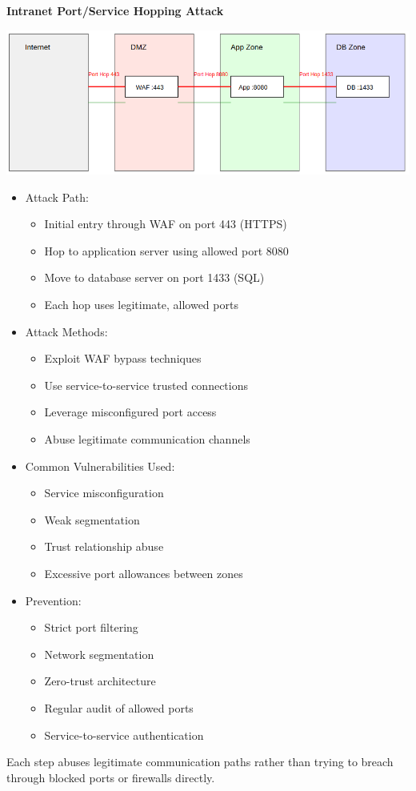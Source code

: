 \textbf{Intranet Port/Service Hopping Attack}
\begin{center}
    \includegraphics[scale=0.5]{resources/02-port-hopping-attack.png}
\end{center}
\begin{itemize}
	\item Attack Path:
    \begin{itemize}
        \tightlist
		\item Initial entry through WAF on port 443 (HTTPS)
		\item Hop to application server using allowed port 8080
		\item Move to database server on port 1433 (SQL)
		\item Each hop uses legitimate, allowed ports
    \end{itemize}

	\item Attack Methods:
    \begin{itemize}
        \tightlist
		\item Exploit WAF bypass techniques
		\item Use service-to-service trusted connections
		\item Leverage misconfigured port access
		\item Abuse legitimate communication channels
    \end{itemize}

	\item Common Vulnerabilities Used:
    \begin{itemize}
        \tightlist
		\item Service misconfiguration
		\item Weak segmentation
		\item Trust relationship abuse
		\item Excessive port allowances between zones
    \end{itemize}

	\item Prevention:
    \begin{itemize}
        \tightlist
		\item Strict port filtering
		\item Network segmentation
		\item Zero-trust architecture
		\item Regular audit of allowed ports
		\item Service-to-service authentication
    \end{itemize}
\end{itemize}
Each step abuses legitimate communication paths rather than trying to breach through blocked ports or firewalls directly.

